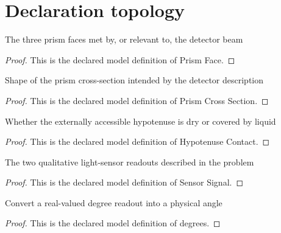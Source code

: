 \section{Declaration topology}
\begin{definition}
  \label{def:physics:phyx-mini-0147:phyxminiproblems-problemphyxmini0147-prismface}
  The three prism faces met by, or relevant to, the detector beam
\end{definition}
\begin{proof}
  This is the declared model definition of Prism Face.
\end{proof}
\begin{definition}
  \label{def:physics:phyx-mini-0147:phyxminiproblems-problemphyxmini0147-prismcrosssection}
  Shape of the prism cross-section intended by the detector description
\end{definition}
\begin{proof}
  This is the declared model definition of Prism Cross Section.
\end{proof}
\begin{definition}
  \label{def:physics:phyx-mini-0147:phyxminiproblems-problemphyxmini0147-hypotenusecontact}
  Whether the externally accessible hypotenuse is dry or covered by liquid
\end{definition}
\begin{proof}
  This is the declared model definition of Hypotenuse Contact.
\end{proof}
\begin{definition}
  \label{def:physics:phyx-mini-0147:phyxminiproblems-problemphyxmini0147-sensorsignal}
  The two qualitative light-sensor readouts described in the problem
\end{definition}
\begin{proof}
  This is the declared model definition of Sensor Signal.
\end{proof}
\begin{definition}[degrees]
  \label{def:physics:phyx-mini-0147:phyxminiproblems-problemphyxmini0147-degrees}
  Convert a real-valued degree readout into a physical angle
\end{definition}
\begin{proof}
  This is the declared model definition of degrees.
\end{proof}
